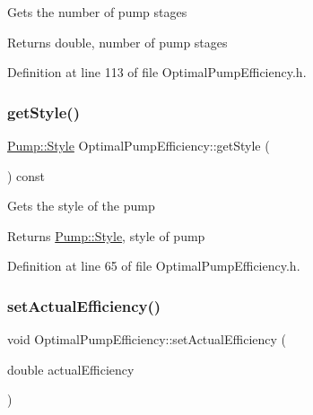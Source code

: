 Gets the number of pump stages \begin{DoxyReturn}{Returns}
double, number of pump stages 
\end{DoxyReturn}


Definition at line 113 of file Optimal\+Pump\+Efficiency.\+h.

\mbox{\label{class_optimal_pump_efficiency_a601fe15e9acc23112743fabe417030fb}} 
\subsubsection{\texorpdfstring{get\+Style()}{getStyle()}}
{\footnotesize\ttfamily \hyperlink{class_pump_aef354601ce4218258cc898b35a1e90ff}{Pump\+::\+Style} Optimal\+Pump\+Efficiency\+::get\+Style (\begin{DoxyParamCaption}{ }\end{DoxyParamCaption}) const\hspace{0.3cm}{\ttfamily [inline]}}

Gets the style of the pump \begin{DoxyReturn}{Returns}
\hyperlink{class_pump_aef354601ce4218258cc898b35a1e90ff}{Pump\+::\+Style}, style of pump 
\end{DoxyReturn}


Definition at line 65 of file Optimal\+Pump\+Efficiency.\+h.

\mbox{\label{class_optimal_pump_efficiency_a539b20c53c7ba6a5983a60d74be4ac9e}} 
\subsubsection{\texorpdfstring{set\+Actual\+Efficiency()}{setActualEfficiency()}}
{\footnotesize\ttfamily void Optimal\+Pump\+Efficiency\+::set\+Actual\+Efficiency (\begin{DoxyParamCaption}\item[{double}]{actual\+Efficiency }\end{DoxyParamCaption})\hspace{0.3cm}{\ttfamily [inline]}}

